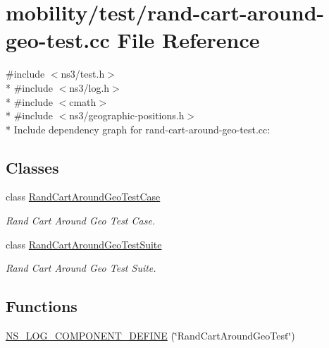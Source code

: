 \hypertarget{rand-cart-around-geo-test_8cc}{}\section{mobility/test/rand-\/cart-\/around-\/geo-\/test.cc File Reference}
\label{rand-cart-around-geo-test_8cc}
{\ttfamily \#include $<$ns3/test.\+h$>$}\\*
{\ttfamily \#include $<$ns3/log.\+h$>$}\\*
{\ttfamily \#include $<$cmath$>$}\\*
{\ttfamily \#include $<$ns3/geographic-\/positions.\+h$>$}\\*
Include dependency graph for rand-\/cart-\/around-\/geo-\/test.cc\+:
\subsection*{Classes}
\begin{DoxyCompactItemize}
\item 
class \hyperlink{classRandCartAroundGeoTestCase}{Rand\+Cart\+Around\+Geo\+Test\+Case}
\begin{DoxyCompactList}\small\item\em Rand Cart Around Geo Test Case. \end{DoxyCompactList}\item 
class \hyperlink{classRandCartAroundGeoTestSuite}{Rand\+Cart\+Around\+Geo\+Test\+Suite}
\begin{DoxyCompactList}\small\item\em Rand Cart Around Geo Test Suite. \end{DoxyCompactList}\end{DoxyCompactItemize}
\subsection*{Functions}
\begin{DoxyCompactItemize}
\item 
\hyperlink{rand-cart-around-geo-test_8cc_ab8d3bbef6dc69b4c1389dff58b6b4ac6}{N\+S\+\_\+\+L\+O\+G\+\_\+\+C\+O\+M\+P\+O\+N\+E\+N\+T\+\_\+\+D\+E\+F\+I\+NE} (\char`\"{}Rand\+Cart\+Around\+Geo\+Test\char`\"{})
\end{DoxyCompactItemize}
